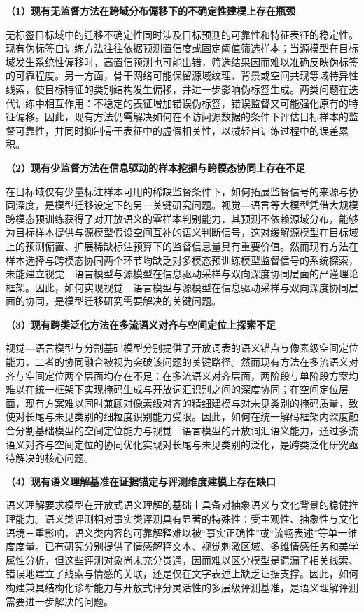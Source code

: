 \noindent\textbf{（1）现有无监督方法在跨域分布偏移下的不确定性建模上存在瓶颈}

无标签目标域中的迁移不确定性同时涉及目标预测的可靠性和特征表征的稳定性。现有伪标签自训练方法往往依据预测置信度或固定阈值筛选样本；当源模型在目标域发生系统性偏移时，高置信预测也可能出错，筛选结果因而难以准确反映伪标签的可靠程度。另一方面，骨干网络可能保留源域纹理、背景或空间共现等域特异性线索，使目标特征的类别结构发生偏移，并进一步影响伪标签生成。两类问题在迭代训练中相互作用：不稳定的表征增加错误伪标签，错误监督又可能强化原有的特征偏移。因此，现有方法仍需解决如何在不访问源数据的条件下评估目标样本的监督可靠性，并同时抑制骨干表征中的虚假相关性，以减轻自训练过程中的误差累积。

\noindent\textbf{（2）现有少监督方法在信息驱动的样本挖掘与跨模态协同上存在不足}

在目标域仅有少量标注样本可用的稀缺监督条件下，如何拓展监督信号的来源与协同深度，是模型迁移设定下的另一关键研究问题。视觉—语言等大模型凭借大规模跨模态预训练获得了对开放语义的零样本判别能力，其预测不依赖源域分布，能够为目标样本提供与源模型假设空间互补的语义判断信号，这对缓解源模型在目标域上的预测偏置、扩展稀缺标注预算下的监督信息量具有重要价值。然而现有方法在样本选择与跨模态协同两个环节均缺乏对多模态预训练模型监督信号的系统探索，未能建立视觉—语言模型与源模型在信息驱动采样与双向深度协同层面的严谨理论框架。因此，如何实现视觉—语言模型与源模型在信息驱动采样与双向深度协同层面的协同，是模型迁移研究需要解决的关键问题。

\noindent\textbf{（3）现有跨类泛化方法在多流语义对齐与空间定位上探索不足}

视觉—语言模型与分割基础模型分别提供了开放词表的语义锚点与像素级空间定位能力，二者的协同融合被视为突破该问题的关键路径。然而现有方法在多流语义对齐与空间定位两个层面均存在不足：在多流语义对齐层面，两阶段与单阶段方案均难以在统一框架下实现掩码生成与开放词汇识别之间的深度协同；在空间定位层面，现有方案难以同时兼顾对像素级对齐的精细建模与对未见类别的掩码质量，致使对长尾与未见类别的细粒度识别能力受限。因此，如何在统一解码框架内深度融合分割基础模型的空间定位能力与视觉—语言模型的开放词汇语义能力，通过多流语义对齐与空间定位的协同优化实现对长尾与未见类别的泛化，是跨类泛化研究亟待解决的核心问题。

\noindent\textbf{（4）现有语义理解基准在证据锚定与评测维度建模上存在缺口}

语义理解要求模型在开放式语义理解的基础上具备对抽象语义与文化背景的稳健推理能力。语义类评测相对事实类评测具有显著的特殊性：受主观性、抽象性与文化语境三重影响，语义类内容的可靠解释难以被“事实正确性”或“流畅表述”等单一维度度量。已有研究分别提供了情感解释文本、视觉刺激区域、多维情感任务和美学属性分析，但这些评测对象尚未充分贯通，因而难以区分模型是遗漏了相关线索、错误地建立了线索与情感的关联，还是仅在文字表述上缺乏证据支撑。因此，如何构建兼具结构化诊断能力与开放式评分灵活性的多层级评测基准，是语义理解评测需要进一步解决的问题。

